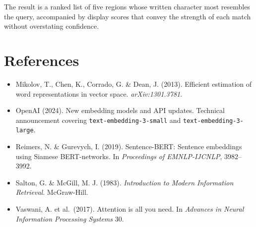\documentclass[11pt]{article}
\begin{document}
The result is a ranked list of five regions whose written character most resembles the query, accompanied by display scores that convey the strength of each match without overstating confidence.

\section*{References}

\begin{itemize}[leftmargin=2em,itemsep=0.2em]
\item Mikolov, T., Chen, K., Corrado, G. \& Dean, J. (2013). Efficient estimation of word representations in vector space. \emph{arXiv:1301.3781}.
\item OpenAI (2024). New embedding models and API updates. Technical announcement covering \texttt{text-embedding-3-small} and \texttt{text-embedding-3-large}.
\item Reimers, N. \& Gurevych, I. (2019). Sentence-BERT: Sentence embeddings using Siamese BERT-networks. In \emph{Proceedings of EMNLP-IJCNLP}, 3982--3992.
\item Salton, G. \& McGill, M. J. (1983). \emph{Introduction to Modern Information Retrieval}. McGraw-Hill.
\item Vaswani, A. et al.\ (2017). Attention is all you need. In \emph{Advances in Neural Information Processing Systems} 30.
\end{itemize}
\end{document}

